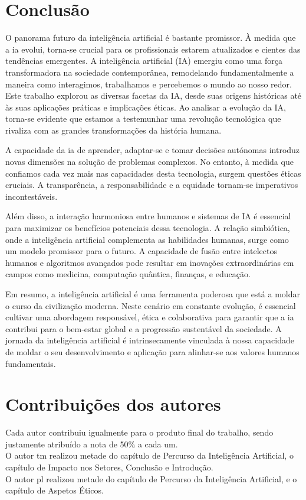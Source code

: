 \documentclass[a4paper, 11pt, onecolumn, oneside]{report}
\begin{document}
\chapter{Conclusão}
\label{chap.Conclusão}
O panorama futuro da inteligência artificial é bastante promissor. À medida que a \ac{ia} evolui, torna-se crucial para os profissionais estarem atualizados e cientes das tendências emergentes. A inteligência artificial (IA) emergiu como uma força transformadora na sociedade contemporânea, remodelando fundamentalmente a maneira como interagimos, trabalhamos e percebemos o mundo ao nosso redor. Este trabalho explorou as diversas facetas da IA, desde suas origens históricas até às suas aplicações práticas e implicações éticas. Ao analisar a evolução da IA, torna-se evidente que estamos a testemunhar uma revolução tecnológica que rivaliza com as grandes transformações da história humana.
\par
A capacidade da \ac{ia} de aprender, adaptar-se e tomar decisões autónomas introduz novas dimensões na solução de problemas complexos. No entanto, à medida que confiamos cada vez mais nas capacidades desta tecnologia, surgem questões éticas cruciais. A transparência, a responsabilidade e a equidade tornam-se imperativos incontestáveis.
\par
Além disso, a interação harmoniosa entre humanos e sistemas de IA é essencial para maximizar os benefícios potenciais dessa tecnologia. A relação simbiótica, onde a inteligência artificial complementa as habilidades humanas, surge como um modelo promissor para o futuro. A capacidade de fusão entre intelectos humanos e algoritmos avançados pode resultar em inovações extraordinárias em campos como medicina, computação quântica, finanças, e educação.
\par
Em resumo, a inteligência artificial é uma ferramenta poderosa que está a moldar o curso da civilização moderna. Neste cenário em constante evolução, é essencial cultivar uma abordagem responsável, ética e colaborativa para garantir que a \ac{ia} contribui para o bem-estar global e a progressão sustentável da sociedade. A jornada da inteligência artificial é intrinsecamente vinculada à nossa capacidade de moldar o seu desenvolvimento e aplicação para alinhar-se aos valores humanos fundamentais.


\chapter*{Contribuições dos autores}
Cada autor contribuiu igualmente para o produto final do trabalho, sendo justamente atribuído a nota de 50\% a cada um. \\
O autor \ac{tm} realizou metade do capítulo de Percurso da Inteligência Artificial, o capítulo de Impacto nos Setores, Conclusão e Introdução. \\
O autor \ac{pl} realizou metade do capítulo de Percurso da Inteligência Artificial, e o capítulo de Aspetos Éticos.
\end{document}
